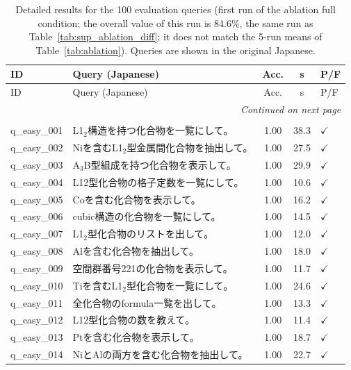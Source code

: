 \begin{longtable}{lp{8.1cm}ccl}
  \caption{Detailed results for the 100 evaluation queries (first run of the ablation full condition; the overall value of this run is 84.6\%, the same run as Table~\ref{tab:sup_ablation_diff}; it does not match the 5-run means of Table~\ref{tab:ablation}). Queries are shown in the original Japanese.}
  \label{tab:sup_query_detail} \\
  \toprule
  ID & Query (Japanese) & Acc. & s & P/F \\
  \midrule
  \endfirsthead
  \toprule
  ID & Query (Japanese) & Acc. & s & P/F \\
  \midrule
  \endhead
  \midrule
  \multicolumn{5}{r}{\textit{Continued on next page}} \\
  \endfoot
  \bottomrule
  \endlastfoot
    \midrule
    \multicolumn{5}{l}{Easy ($n$=20)} \\
    \midrule
    q\_easy\_001 & L1$_2$構造を持つ化合物を一覧にして。 & 1.00 & 38.3 & $\checkmark$ \\
    q\_easy\_002 & Niを含むL1$_2$型金属間化合物を抽出して。 & 1.00 & 27.5 & $\checkmark$ \\
    q\_easy\_003 & A$_3$B型組成を持つ化合物を表示して。 & 1.00 & 29.9 & $\checkmark$ \\
    q\_easy\_004 & L12型化合物の格子定数を一覧にして。 & 1.00 & 10.6 & $\checkmark$ \\
    q\_easy\_005 & Coを含む化合物を表示して。 & 1.00 & 16.2 & $\checkmark$ \\
    q\_easy\_006 & cubic構造の化合物を一覧にして。 & 1.00 & 14.5 & $\checkmark$ \\
    q\_easy\_007 & L1$_2$型化合物のリストを出して。 & 1.00 & 12.0 & $\checkmark$ \\
    q\_easy\_008 & Alを含む化合物を抽出して。 & 1.00 & 18.0 & $\checkmark$ \\
    q\_easy\_009 & 空間群番号221の化合物を表示して。 & 1.00 & 11.7 & $\checkmark$ \\
    q\_easy\_010 & Tiを含むL1$_2$型化合物を一覧にして。 & 1.00 & 24.6 & $\checkmark$ \\
    q\_easy\_011 & 全化合物のformula一覧を出して。 & 1.00 & 13.3 & $\checkmark$ \\
    q\_easy\_012 & L12型化合物の数を教えて。 & 1.00 & 11.4 & $\checkmark$ \\
    q\_easy\_013 & Ptを含む化合物を表示して。 & 1.00 & 18.7 & $\checkmark$ \\
    q\_easy\_014 & NiとAlの両方を含む化合物を抽出して。 & 1.00 & 22.7 & $\checkmark$ \\

\end{longtable}
